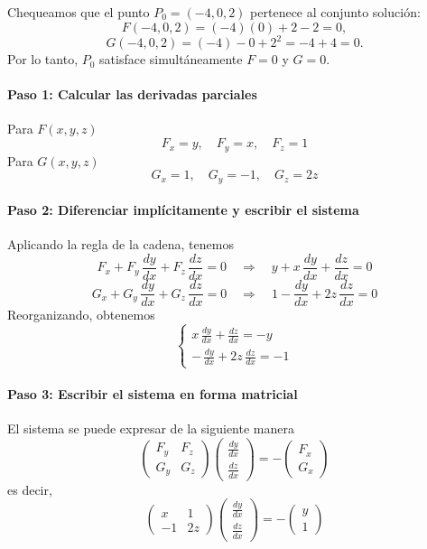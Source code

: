 \documentclass{article}
\begin{document}
Chequeamos que el punto \(P_0=(-4,0,2)\) pertenece al conjunto solución:
\[
F(-4,0,2)=(-4)(0)+2-2=0,
\]
\[
G(-4,0,2)=(-4)-0+2^2=-4+4=0.
\]
Por lo tanto, \(P_0\) satisface simultáneamente \(F=0\) y \(G=0\).

\paragraph{Paso 1: Calcular las derivadas parciales}  
Para \( F(x,y,z) \)
\[
F_x = y,\quad F_y = x,\quad F_z = 1
\]
Para \( G(x,y,z) \)
\[
G_x = 1,\quad G_y = -1,\quad G_z = 2z
\]

\paragraph{Paso 2: Diferenciar implícitamente y escribir el sistema}  
Aplicando la regla de la cadena, tenemos
\[
F_x + F_y\,\frac{dy}{dx}+F_z\,\frac{dz}{dx}=0 \quad \Longrightarrow \quad y + x\,\frac{dy}{dx}+ \frac{dz}{dx} = 0
\]
\[
G_x + G_y\,\frac{dy}{dx}+G_z\,\frac{dz}{dx}=0 \quad \Longrightarrow \quad 1 - \frac{dy}{dx}+2z\,\frac{dz}{dx} = 0
\]
Reorganizando, obtenemos
\[
\begin{cases}
x\,\frac{dy}{dx}+ \frac{dz}{dx} = -y \\
-\,\frac{dy}{dx}+2z\,\frac{dz}{dx} = -1
\end{cases}
\]

\paragraph{Paso 3: Escribir el sistema en forma matricial}  
El sistema se puede expresar de la siguiente manera
\[
\begin{pmatrix}
F_y & F_z \\
G_y & G_z
\end{pmatrix}
\begin{pmatrix}
\frac{dy}{dx} \\
\frac{dz}{dx}
\end{pmatrix}
=
-\begin{pmatrix}
F_x \\
G_x
\end{pmatrix}
\]
es decir,
\[
\begin{pmatrix}
x & 1 \\
-1 & 2z
\end{pmatrix}
\begin{pmatrix}
\frac{dy}{dx} \\
\frac{dz}{dx}
\end{pmatrix}
=
-\begin{pmatrix}
y \\
1
\end{pmatrix}
\]
\end{document}
